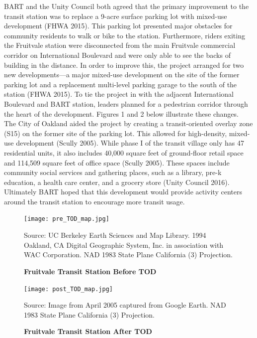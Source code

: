 \documentclass{article}
\begin{document}
BART and the Unity Council both agreed that the primary improvement to the transit station was to replace a 9-acre surface parking lot with mixed-use development (FHWA 2015). This parking lot presented major obstacles for community residents to walk or bike to the station. Furthermore, riders exiting the Fruitvale station were disconnected from the main Fruitvale commercial corridor on International Boulevard and were only able to see the backs of building in the distance. In order to improve this, the project arranged for two new developments---a major mixed-use development on the site of the former parking lot and a replacement multi-level parking garage to the south of the station (FHWA 2015). To tie the project in with the adjacent International Boulevard and BART station, leaders planned for a pedestrian corridor through the heart of the development. Figures 1 and 2 below illustrate these changes.  \\

\noindent
The City of Oakland aided the project by creating a transit-oriented overlay zone (S15) on the former site of the parking lot. This allowed for high-density, mixed-use development (Scully 2005). While phase I of the transit village only has 47 residential units, it also includes 40,000 square feet of ground-floor retail space and 114,509 square feet of office space (Scully 2005). These spaces include community social services and gathering places, such as a library, pre-k education, a health care center, and a grocery store (Unity Council 2016). Ultimately BART hoped that this development would provide activity centers around the transit station to encourage more transit usage. \\

\newpage

\begin{figure}[H]
	\label{fig:Figure 1}
	\caption{\textbf{Fruitvale Transit Station Before TOD}}
	\begin{minipage}{\textwidth} %
	\texttt{[image: pre\_TOD\_map.jpg]}
	{\footnotesize Source: UC Berkeley Earth Sciences and Map Library. 1994 Oakland, CA Digital Geographic System, Inc. in association with WAC Corporation. NAD 1983 State Plane California (3) Projection.\par}
\end{minipage}
\end{figure}

\begin{figure}[H]
	\label{fig:Figure 2}
	\caption{\textbf{Fruitvale Transit Station After TOD}}
	\begin{minipage}{\textwidth} %
	\texttt{[image: post\_TOD\_map.jpg]}
	{\footnotesize Source: Image from April 2005 captured from Google Earth. NAD 1983 State Plane California (3) Projection.\par}
	\end{minipage}
\end{figure}
\end{document}
